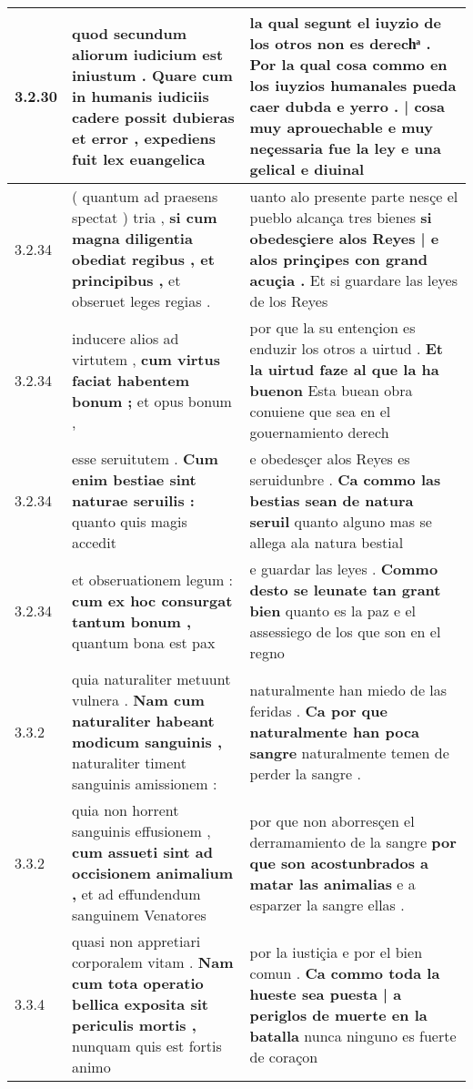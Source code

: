 \begin{tabular}{|p{1cm}|p{6.5cm}|p{6.5cm}|}
3.2.30 & quod secundum aliorum iudicium est iniustum . \textbf{ Quare cum in humanis iudiciis cadere possit dubieras et error , } expediens fuit lex euangelica & la qual segunt el iuyzio de los otros non es derechͣ . \textbf{ Por la qual cosa commo en los iuyzios humanales pueda caer dubda e yerro . | cosa muy aprouechable } e muy neçessaria fue la ley e una gelical e diuinal \\\hline
3.2.34 & ( quantum ad praesens spectat ) tria , \textbf{ si cum magna diligentia obediat regibus , et principibus , } et obseruet leges regias . & uanto alo presente parte nesçe el pueblo alcança tres bienes \textbf{ si obedesçiere alos Reyes | e alos prinçipes con grand acuçia . } Et si guardare las leyes de los Reyes \\\hline
3.2.34 & inducere alios ad virtutem , \textbf{ cum virtus faciat habentem bonum ; } et opus bonum , & por que la su entençion es enduzir los otros a uirtud . \textbf{ Et la uirtud faze al que la ha buenon } Esta buean obra conuiene que sea en el gouernamiento derech \\\hline
3.2.34 & esse seruitutem . \textbf{ Cum enim bestiae sint naturae seruilis : } quanto quis magis accedit & e obedesçer alos Reyes es seruidunbre . \textbf{ Ca commo las bestias sean de natura seruil } quanto alguno mas se allega ala natura bestial \\\hline
3.2.34 & et obseruationem legum : \textbf{ cum ex hoc consurgat tantum bonum , } quantum bona est pax & e guardar las leyes . \textbf{ Commo desto se leunate tan grant bien } quanto es la paz e el assessiego de los que son en el regno \\\hline
3.3.2 & quia naturaliter metuunt vulnera . \textbf{ Nam cum naturaliter habeant modicum sanguinis , } naturaliter timent sanguinis amissionem : & naturalmente han miedo de las feridas . \textbf{ Ca por que naturalmente han poca sangre } naturalmente temen de perder la sangre . \\\hline
3.3.2 & quia non horrent sanguinis effusionem , \textbf{ cum assueti sint ad occisionem animalium , } et ad effundendum sanguinem Venatores & por que non aborresçen el derramamiento de la sangre \textbf{ por que son acostunbrados a matar las animalias } e a esparzer la sangre ellas . \\\hline
3.3.4 & quasi non appretiari corporalem vitam . \textbf{ Nam cum tota operatio bellica exposita sit periculis mortis , } nunquam quis est fortis animo & por la iustiçia e por el bien comun . \textbf{ Ca commo toda la hueste sea puesta | a periglos de muerte en la batalla } nunca ninguno es fuerte de coraçon \\\hline

\end{tabular}
